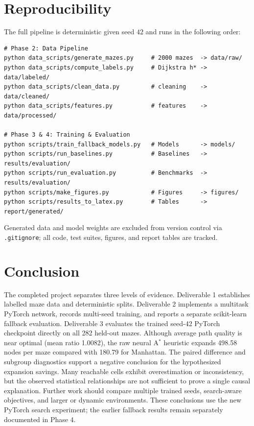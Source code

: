 \documentclass[11pt]{article}
\begin{document}
\section{Reproducibility}
The full pipeline is deterministic given seed $42$ and runs in the following order:

\begin{verbatim}
# Phase 2: Data Pipeline
python data_scripts/generate_mazes.py     # 2000 mazes  -> data/raw/
python data_scripts/compute_labels.py     # Dijkstra h* -> data/labeled/
python data_scripts/clean_data.py         # cleaning    -> data/cleaned/
python data_scripts/features.py           # features    -> data/processed/

# Phase 3 & 4: Training & Evaluation
python scripts/train_fallback_models.py   # Models      -> models/
python scripts/run_baselines.py           # Baselines   -> results/evaluation/
python scripts/run_evaluation.py          # Benchmarks  -> results/evaluation/
python scripts/make_figures.py            # Figures     -> figures/
python scripts/results_to_latex.py        # Tables      -> report/generated/
\end{verbatim}

Generated data and model weights are excluded from version control via
\texttt{.gitignore}; all code, test suites, figures, and report tables are tracked.

\section{Conclusion}
The completed project separates three levels of evidence. Deliverable 1
establishes labelled maze data and deterministic splits. Deliverable 2
implements a multitask PyTorch network, records multi-seed training, and
reports a separate scikit-learn fallback evaluation. Deliverable 3 evaluates
the trained seed-42 PyTorch checkpoint directly on all 282 held-out mazes.
Although average path quality is near optimal (mean ratio 1.0082), the raw
neural A$^\ast$ heuristic expands 498.58 nodes per maze compared with
180.79 for Manhattan. The paired difference and subgroup diagnostics
support a negative conclusion for the hypothesized expansion savings.
Many reachable cells exhibit overestimation or inconsistency, but the
observed statistical relationships are not sufficient to prove a single
causal explanation. Further work should compare multiple trained seeds,
search-aware objectives, and larger or dynamic environments. These
conclusions use the new PyTorch search experiment; the earlier fallback
results remain separately documented in Phase 4.
\end{document}
